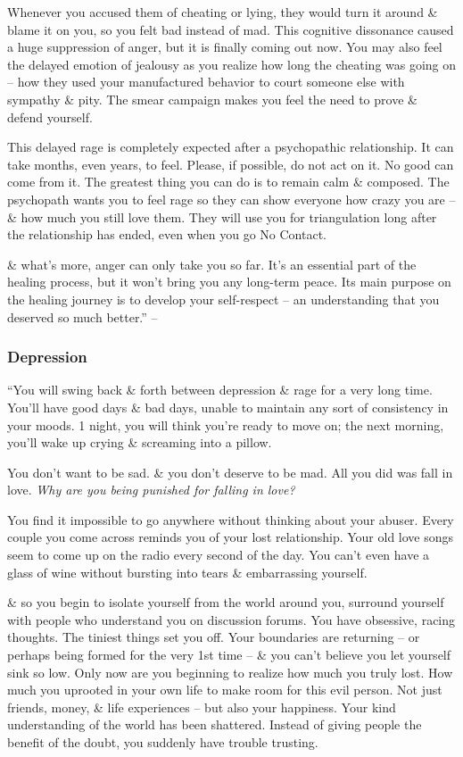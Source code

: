 \documentclass{article}
\numberwithin{equation}{section}
\begin{document}
Whenever you accused them of cheating or lying, they would turn it around \& blame it on you, so you felt bad instead of mad. This cognitive dissonance caused a huge suppression of anger, but it is finally coming out now. You may also feel the delayed emotion of jealousy as you realize how long the cheating was going on -- how they used your manufactured behavior to court someone else with sympathy \& pity. The smear campaign makes you feel the need to prove \& defend yourself.

This delayed rage is completely expected after a psychopathic relationship. It can take months, even years, to feel. Please, if possible, do not act on it. No good can come from it. The greatest thing you can do is to remain calm \& composed. The psychopath wants you to feel rage so they can show everyone how crazy you are -- \& how much you still love them. They will use you for triangulation long after the relationship has ended, even when you go No Contact.

\& what's more, anger can only take you so far. It's an essential part of the healing process, but it won't bring you any long-term peace. Its main purpose on the healing journey is to develop your self-respect -- an understanding that you deserved so much better.'' -- \cite[p. 123]{MacKenzie2015}

\subsubsection{Depression}
``You will swing back \& forth between depression \& rage for a very long time. You'll have good days \& bad days, unable to maintain any sort of consistency in your moods. 1 night, you will think you're ready to move on; the next morning, you'll wake up crying \& screaming into a pillow.

You don't want to be sad. \& you don't deserve to be mad. All you did was fall in love. \textit{Why are you being punished for falling in love?}

You find it impossible to go anywhere without thinking about your abuser. Every couple you come across reminds you of your lost relationship. Your old love songs seem to come up on the radio every second of the day. You can't even have a glass of wine without bursting into tears \& embarrassing yourself.

\& so you begin to isolate yourself from the world around you, surround yourself with people who understand you on discussion forums. You have obsessive, racing thoughts. The tiniest things set you off. Your boundaries are returning -- or perhaps being formed for the very 1st time -- \& you can't believe you let yourself sink so low. Only now are you beginning to realize how much you truly lost. How much you uprooted in your own life to make room for this evil person. Not just friends, money, \& life experiences -- but also your happiness. Your kind understanding of the world has been shattered. Instead of giving people the benefit of the doubt, you suddenly have trouble trusting.
\end{document}
